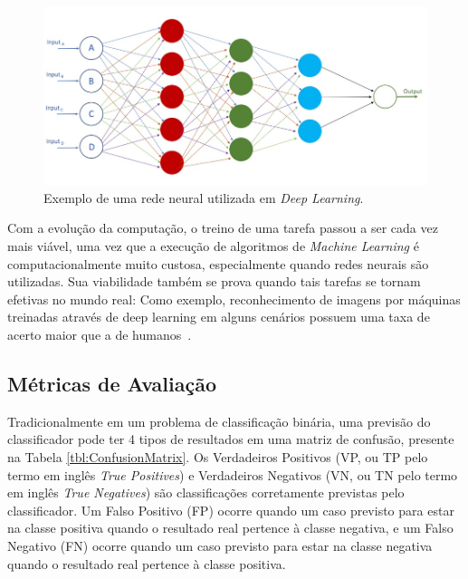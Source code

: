 \documentclass[portugues]{ic-tese}
\begin{document}
\begin{figure}[h]
\centering
\includegraphics[scale=0.8]{images/deep_neural_network.jpg}
\caption {Exemplo de uma rede neural utilizada em \textit{Deep Learning}.}
\label{fig:NeuralNetwork}
\end{figure}

Com a evolução da computação, o treino de uma tarefa passou a ser cada vez mais viável, uma vez que a execução de algoritmos de \textit{Machine Learning} é computacionalmente muito custosa, especialmente quando redes neurais são utilizadas. Sua viabilidade também se prova quando tais tarefas se tornam efetivas no mundo real: Como exemplo, reconhecimento de imagens por máquinas treinadas através de deep learning em alguns cenários possuem uma taxa de acerto maior que a de humanos~\citep{Copeland_2016}.

\subsection{Métricas de Avaliação}

Tradicionalmente em um problema de classificação binária, uma previsão do classificador pode ter 4 tipos de resultados em uma matriz de confusão, presente na Tabela \ref{tbl:ConfusionMatrix}. Os Verdadeiros Positivos (VP, ou TP pelo termo em inglês \textit{True Positives}) e Verdadeiros Negativos (VN, ou TN pelo termo em inglês \textit{True Negatives}) são classificações corretamente previstas pelo classificador. Um Falso Positivo (FP) ocorre quando um caso previsto para estar na classe positiva quando o resultado real pertence à classe negativa, e um Falso Negativo (FN) ocorre quando um caso previsto para estar na classe negativa
quando o resultado real pertence à classe positiva.
\end{document}
